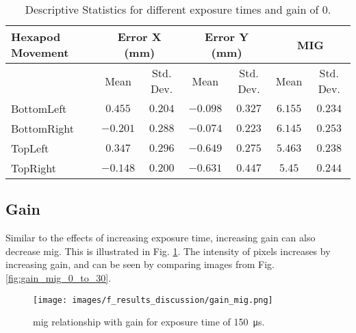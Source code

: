 \begin{table}[h]
    \vspace{10pt}

    \begin{subtable}{\textwidth}
        \centering
        \footnotesize
        \begin{tabular}{lcccccc}
            \toprule
            Hexapod Movement & \multicolumn{2}{c}{Error X (mm)} & \multicolumn{2}{c}{Error Y (mm)} & \multicolumn{2}{c}{MIG}  \\
            \midrule
            & \multicolumn{1}{c}{Mean} & \multicolumn{1}{c}{Std. Dev.} & \multicolumn{1}{c}{Mean} & \multicolumn{1}{c}{Std. Dev.} & \multicolumn{1}{c}{Mean} & \multicolumn{1}{c}{Std. Dev.} \\
            \midrule
            \textsf{BottomLeft} & $0.455$ & $0.204$ & $-0.098$ & $0.327$ & $6.155$ & $0.234$ \\
            \textsf{BottomRight} & $-0.201$ & $0.288$ & $-0.074$ & $0.223$ & $6.145$ & $0.253$ \\
            \textsf{TopLeft} & $0.347$ & $0.296$ & $-0.649$ & $0.275$ & $5.463$ & $0.238$ \\
            \textsf{TopRight} & $-0.148$ & $0.200$ & $-0.631$ & $0.447$ & $5.45$ & $0.244$ \\
            \bottomrule
        \end{tabular}
        \caption{\SI{3000}{\micro\second}}
    \end{subtable}

    \caption{Descriptive Statistics for different exposure times and gain of $0$.}
    \label{table:stats_matrix_exposuretime}
\end{table}

\clearpage

\subsection*{Gain}
Similar to the effects of increasing exposure time, increasing gain can also decrease \gls{mig}. This is illustrated in Fig. \ref{fig:gain_mig.png}. The intensity of pixels increases by increasing gain, and can be seen by comparing images from Fig. \ref{fig:gain_mig_0_to_30}.

\begin{figure}[h]
    \centering
    \texttt{[image: images/f\_results\_discussion/gain\_mig.png]}
    \caption{\gls{mig} relationship with gain for exposure time of \SI{150}{\micro\second}.}
    \label{fig:gain_mig.png}
\end{figure}

